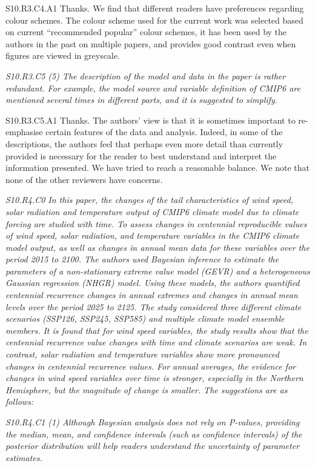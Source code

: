 \documentclass[a4paper,10pt]{article}
\begin{document}
	S10.R3.C4.A1 Thanks. We find that different readers have preferences regarding colour schemes. The colour scheme used for the current work was selected based on current ``recommended popular'' colour schemes, it has been used by the authors in the past on multiple papers, and provides good contrast even when figures are viewed in greyscale.

	\emph{S10.R3.C5 (5) The description of the model and data in the paper is rather redundant. For example, the model source and variable definition of CMIP6 are mentioned several times in different parts, and it is suggested to simplify.}

	S10.R3.C5.A1 Thanks. The authors' view is that it is sometimes important to re-emphasise certain features of the data and analysis. Indeed, in some of the descriptions, the authors feel that perhaps even more detail than currently provided is necessary for the reader to best understand and interpret the information presented. We have tried to reach a reasonable balance. We note that none of the other reviewers have concerns.
	
	\emph{S10.R4.C0 In this paper, the changes of the tail characteristics of wind speed, solar radiation and temperature output of CMIP6 climate model due to climate forcing are studied with time. To assess changes in centennial reproducible values of wind speed, solar radiation, and temperature variables in the CMIP6 climate model output, as well as changes in annual mean data for these variables over the period 2015 to 2100. The authors used Bayesian inference to estimate the parameters of a non-stationary extreme value model (GEVR) and a heterogeneous Gaussian regression (NHGR) model. Using these models, the authors quantified centennial recurrence changes in annual extremes and changes in annual mean levels over the period 2025 to 2125. The study considered three different climate scenarios (SSP126, SSP245, SSP585) and multiple climate model ensemble members. It is found that for wind speed variables, the study results show that the centennial recurrence value changes with time and climate scenarios are weak. In contrast, solar radiation and temperature variables show more pronounced changes in centennial recurrence values. For annual averages, the evidence for changes in wind speed variables over time is stronger, especially in the Northern Hemisphere, but the magnitude of change is smaller. The suggestions are as follows:}

	\emph{S10.R4.C1 (1) Although Bayesian analysis does not rely on P-values, providing the median, mean, and confidence intervals (such as confidence intervals) of the posterior distribution will help readers understand the uncertainty of parameter estimates.}
\end{document}
